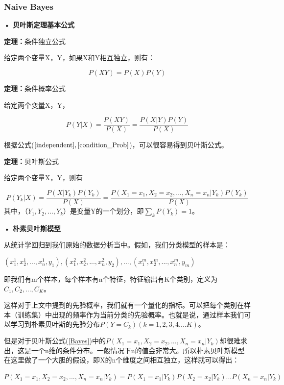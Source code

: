 \documentclass[a4paper,11pt,twoside,openany]{article}
\begin{document}
\begin{CJK*}{UTF8}{gbsn}
\subsubsection{Naive Bayes}
	\textbf{• 贝叶斯定理基本公式}


\textbf{定理：}条件独立公式

给定两个变量X，Y，如果X和Y相互独立，则有：

\begin{equation}\label{independent}
	P(XY) = P(X)P(Y)
\end{equation}

\textbf{定理：}条件概率公式

给定两个变量X，Y，

\begin{equation}\label{condition_Prob}
	P(Y|X) = \frac{P(XY)}{P(X)}= \frac{P(X|Y)P(Y)}{P(X)}
\end{equation}


根据公式($\ref{independent},\ref{condition_Prob}$)，可以很容易得到贝叶斯公式。

\textbf{定理：}贝叶斯公式

给定两个变量X，Y，则有

\begin{equation}\label{Bayes}
P(Y_k|X) = \frac{P(X|Y_k)P(Y_k)}{P(X)} = \frac{P(X_1=x_1,X_2=x_2,...,X_n=x_n|Y_k)P(Y_k)}{P(X)}
\end{equation}
其中，（$Y_1,Y_2,...,Y_k$）是变量Y的一个划分，即$\sum_kP(Y_k)=1$。


\textbf{• 朴素贝叶斯模型}

从统计学回归到我们原始的数据分析当中。假如，我们分类模型的样本是：

\begin{center}
$(x_1^{1},x_2^{1},...,x_n^{1},y_1),(x_1^{2},x_2^{2},...,x_n^{2},y_2),...,(x_1^{m},x_2^{m},...,x_n^{m},y_m)$
\end{center}

即我们有m个样本，每个样本有n个特征，特征输出有K个类别，定义为$C_1,C_2,...,C_K$。

这样对于上文中提到的先验概率，我们就有一个量化的指标。可以把每个类别在样本（训练集）中出现的频率作为当前分类的先验概率。也就是说，通过样本我们可以学习到朴素贝叶斯的先验分布$P(Y=C_k)(k=1,2,3,4....K)$。

但是对于贝叶斯公式(\ref{Bayes})中的$P(X_1=x_1,X_2=x_2,...,X_n=x_n|Y_k)$却很难求出，这是一个n维的条件分布。一般情况下n的值会非常大。所以朴素贝叶斯模型在这里做了一个大胆的假设，即X的n个维度之间相互独立，这样就可以得出：

\begin{center}
$P(X_1=x_1,X_2=x_2,...,X_n=x_n|Y_k) = P(X_1 = x_1|Y_k)P(X_2 = x_2|Y_k)...P(X_n = x_n|Y_k)$
\end{center}


\end{CJK*}
\end{document}
